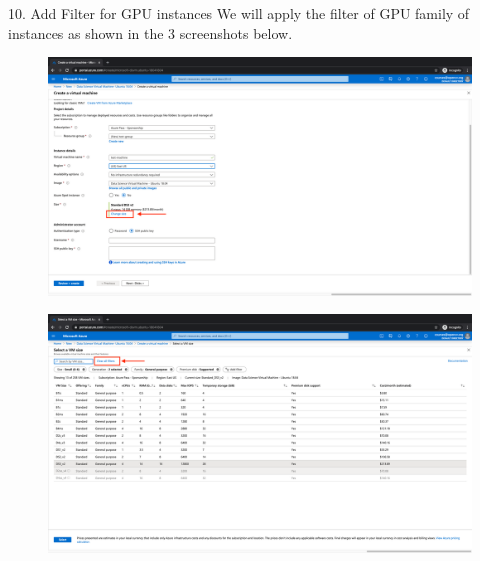 10. Add Filter for GPU instances
We will apply the filter of GPU family of instances as shown in the 3 screenshots below.

\begin{figure}[H]
\begin{center} 
\includegraphics[scale=0.20]{figures/vm8}
\end{center}
\end{figure}

\begin{figure}[H]
\begin{center} 
\includegraphics[scale=0.20]{figures/vm9}
\end{center}
\end{figure}

